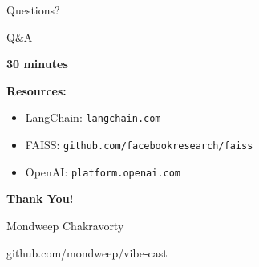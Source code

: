 \documentclass[aspectratio=169]{beamer}
\begin{document}
\begin{frame}{Questions?}
    \begin{center}
        \Huge Q\&A

        \vspace{1em}

        \Large\textbf{30 minutes}
    \end{center}

    \vspace{2em}

    \textbf{Resources:}
    \begin{itemize}
        \item LangChain: \texttt{langchain.com}
        \item FAISS: \texttt{github.com/facebookresearch/faiss}
        \item OpenAI: \texttt{platform.openai.com}
    \end{itemize}
\end{frame}

\begin{frame}
    \begin{center}
        \Huge\textbf{Thank You!}

        \vspace{1em}

        \Large Mondweep Chakravorty

        \vspace{2em}

        \normalsize
        github.com/mondweep/vibe-cast
    \end{center}
\end{frame}
\end{document}
